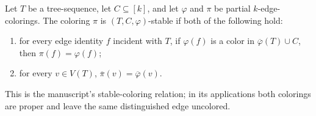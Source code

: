 \begin{definition}
Let $T$ be a tree-sequence, let $C\subseteq[k]$, and let $\varphi$ and
$\pi$ be partial $k$-edge-colorings.  The coloring $\pi$ is
$(T,C,\varphi)$-stable if both of the following hold:
\begin{enumerate}
\item for every edge identity $f$ incident with $T$, if $\varphi(f)$ is a
color in $\overline\varphi(T)\cup C$, then $\pi(f)=\varphi(f)$;
\item for every $v\in V(T)$,
$\overline\pi(v)=\overline\varphi(v)$.
\end{enumerate}
This is the manuscript's stable-coloring relation; in its applications both
colorings are proper and leave the same distinguished edge uncolored.
\end{definition}

